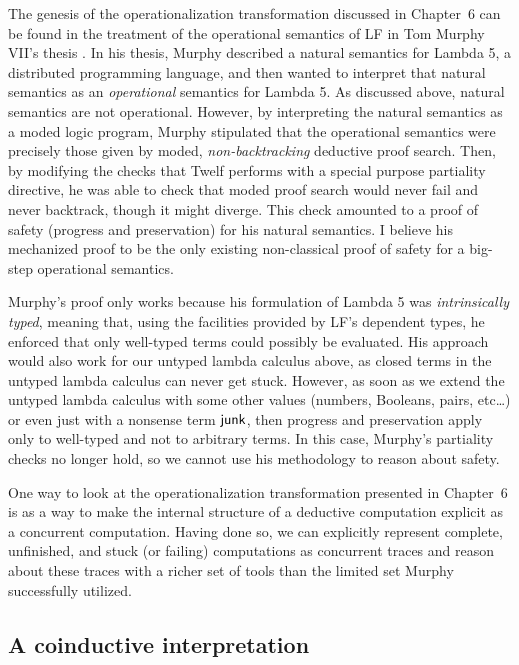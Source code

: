 The genesis of the operationalization transformation discussed in
Chapter~6 can be found in the treatment of the operational semantics
of LF in Tom Murphy VII's thesis \cite{murphy08modal}. In his thesis,
Murphy described a natural semantics for Lambda 5, a distributed
programming language, and then wanted to interpret that natural
semantics as an {\it operational} semantics for Lambda 5. As discussed
above, natural semantics are not operational. However, by interpreting
the natural semantics as a moded logic program, Murphy stipulated that
the operational semantics were precisely those given by moded, {\it
  non-backtracking} deductive proof search. Then, by modifying the
checks that Twelf performs with a special purpose partiality
directive, he was able to check that moded proof search would never
fail and never backtrack, though it might diverge. This check amounted
to a proof of safety (progress and preservation) for his natural
semantics. I believe his mechanized proof to be the only existing
non-classical proof of safety for a big-step operational semantics.

Murphy's proof only works because his formulation of Lambda 5 was {\it
  intrinsically typed}, meaning that, using the facilities provided by
LF's dependent types, he enforced that only well-typed terms could
possibly be evaluated. His approach would also work for our untyped
lambda calculus above, as closed terms in the untyped lambda calculus
can never get stuck. However, as soon as we extend the untyped lambda
calculus with some other values (numbers, Booleans, pairs, etc\ldots)
or even just with a nonsense term ${\sf junk}$, then progress and
preservation apply only to well-typed and not to arbitrary terms. In
this case, Murphy's partiality checks no longer hold, so we cannot use
his methodology to reason about safety. 

One way to look at the operationalization transformation presented in
Chapter~6 is as a way to make the internal structure of a deductive
computation explicit as a concurrent computation. Having done so, we
can explicitly represent complete, unfinished, and stuck (or failing)
computations as concurrent traces and reason about these traces with a
richer set of tools than the limited set Murphy successfully utilized.

\subsection{A coinductive interpretation}

